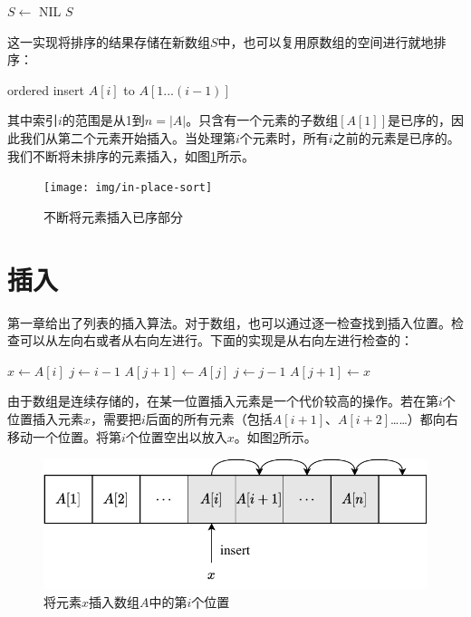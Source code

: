 \documentclass[b5paper]{ctexart}
\begin{document}
\begin{algorithmic}[1]
  \State $S \gets$ NIL
    \State {}
  \EndFor
  \State \Return $S$
\EndFunction
\end{algorithmic}

这一实现将排序的结果存储在新数组$S$中，也可以复用原数组的空间进行就地排序：

\begin{algorithmic}[1]
    \State ordered insert $A[i]$ to $A[1...(i-1)]$
  \EndFor
\EndFunction
\end{algorithmic}

其中索引$i$的范围是从1到$n = |A|$。只含有一个元素的子数组$[A[1]]$是已序的，因此我们从第二个元素开始插入。当处理第$i$个元素时，所有$i$之前的元素是已序的。我们不断将未排序的元素插入，如图\ref{fig:in-place-isort}所示。

\begin{figure}[htbp]
  \centering
  \texttt{[image: img/in-place-sort]}
  \caption{不断将元素插入已序部分}
  \label{fig:in-place-isort}
\end{figure}

\section{插入}

第一章给出了列表的插入算法。对于数组，也可以通过逐一检查找到插入位置。检查可以从左向右或者从右向左进行。下面的实现是从右向左进行检查的：

\begin{algorithmic}[1]
    \State $x \gets A[i]$ 
    \State $j \gets i-1$
      \State $A[j+1] \gets A[j]$
      \State $j \gets j - 1$
    \EndWhile
    \State $A[j+1] \gets x$
  \EndFor
\EndFunction
\end{algorithmic}

由于数组是连续存储的，在某一位置插入元素是一个代价较高的操作。若在第$i$个位置插入元素$x$，需要把$i$后面的所有元素（包括$A[i+1]$、$A[i+2]$……）都向右移动一个位置。将第$i$个位置空出以放入$x$。如图\ref{fig:array-shift}所示。

\begin{figure}[htbp]
  \centering
  \includegraphics[scale=0.7]{img/array-shift}
  \caption{将元素$x$插入数组$A$中的第$i$个位置}
  \label{fig:array-shift}
\end{figure}
\end{document}
